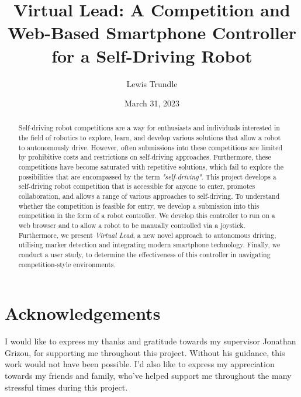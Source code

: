 \documentclass{l4proj}
\begin{document}
\title{Virtual Lead: A Competition and Web-Based Smartphone Controller for a Self-Driving Robot}
\author{Lewis Trundle}
\date{March 31, 2023}

\maketitle

\begin{abstract}
    Self-driving robot competitions are a way for enthusiasts and individuals interested in the field of robotics to explore, learn, and develop various solutions that allow a robot to autonomously drive. However, often submissions into these competitions are limited by prohibitive costs and restrictions on self-driving approaches. Furthermore, these competitions have become saturated with repetitive solutions, which fail to explore the possibilities that are encompassed by the term \textit{"self-driving"}. This project develops a self-driving robot competition that is accessible for anyone to enter, promotes collaboration, and allows a range of various approaches to self-driving. To understand whether the competition is feasible for entry, we develop a submission into this competition in the form of a robot controller. We develop this controller to run on a web browser and to allow a robot to be manually controlled via a joystick. Furthermore, we present \textit{Virtual Lead}, a new novel approach to autonomous driving, utilising marker detection and integrating modern smartphone technology. Finally, we conduct a user study, to determine the effectiveness of this controller in navigating competition-style environments.
\end{abstract}

\setcounter{page}{2}
\chapter*{Acknowledgements}
I would like to express my thanks and gratitude towards my supervisor Jonathan Grizou, for supporting me throughout this project. Without his guidance, this work would not have been possible. I'd also like to express my appreciation towards my friends and family, who've helped support me throughout the many stressful times during this project.
\end{document}
